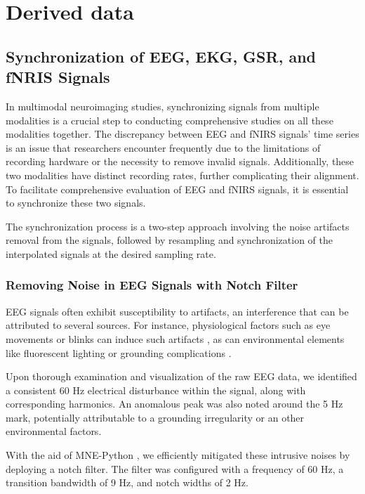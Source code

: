 \section{Derived data}

\subsection{Synchronization of EEG, EKG, GSR, and fNRIS Signals}

In multimodal neuroimaging studies, synchronizing signals from multiple modalities is a crucial step to conducting comprehensive studies on all these modalities together. The discrepancy between EEG and fNIRS signals' time series is an issue that researchers encounter frequently due to the limitations of recording hardware or the necessity to remove invalid signals. Additionally, these two modalities have distinct recording rates, further complicating their alignment. To facilitate comprehensive evaluation of EEG and fNIRS signals, it is essential to synchronize these two signals.

The synchronization process is a two-step approach involving the noise artifacts removal from the signals, followed by resampling and synchronization of the interpolated signals at the desired sampling rate.

\subsubsection{Removing Noise in EEG Signals with Notch Filter}

EEG signals often exhibit susceptibility to artifacts, an interference that can be attributed to several sources. For instance, physiological factors such as eye movements or blinks can induce such artifacts \cite{10.3389/fnhum.2012.00278}, as can environmental elements like fluorescent lighting or grounding complications \cite{Kaya21}.

Upon thorough examination and visualization of the raw EEG data, we identified a consistent 60 Hz electrical disturbance within the signal, along with corresponding harmonics. An anomalous peak was also noted around the 5 Hz mark, potentially attributable to a grounding irregularity or an other environmental factors.

With the aid of MNE-Python \cite{GramfortEtAl2013a}, we efficiently mitigated these intrusive noises by deploying a notch filter. The filter was configured with a frequency of 60 Hz, a transition bandwidth of 9 Hz, and notch widths of 2 Hz.

